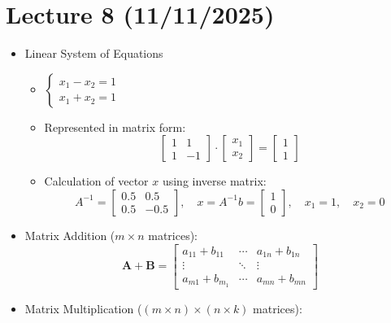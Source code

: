 \documentclass{article}
\begin{document}
\section{Lecture 8 (11/11/2025)}
\begin{itemize}
    \item Linear System of Equations
    \begin{itemize}
        \item $\left\{ \begin{array}{c}
            x_1 - x_2 = 1 \\
            x_1 + x_2 = 1
        \end{array} \right.$
        \item Represented in matrix form:
        \[
        \left[ \begin{array}{cc}
            1 & 1 \\
            1 & -1
        \end{array} \right] \cdot \left[ \begin{array}{c}
            x_1 \\
            x_2 
        \end{array} \right] = \left[ \begin{array}{c}
            1 \\
            1 
        \end{array} \right]
        \]
        \item Calculation of vector $x$ using inverse matrix:
        \[
        A^{-1} = \left[ \begin{array}{cc}
            0.5 & 0.5 \\
            0.5 & -0.5
        \end{array} \right], \quad x= A^{-1} b = \left[ \begin{array}{c}
            1 \\
            0 
        \end{array} \right], \quad x_1 =1, \quad x_2 = 0
        \]
    \end{itemize}
    \item Matrix Addition ($m \times n$ matrices):
    \[
    \bm{A} + \bm{B} = \left[ \begin{array}{ccc}
        a_{11}+b_{11} & \cdots & a_{1n} + b_{1n} \\
        \vdots & \ddots & \vdots \\
        a_{m1} + b_{m_1} & \cdots & a_{mn} + b_{mn}
    \end{array}\right]
    \]
    \item Matrix Multiplication ($(m \times n) \times (n \times k)$ matrices):

\end{itemize}
\end{document}
